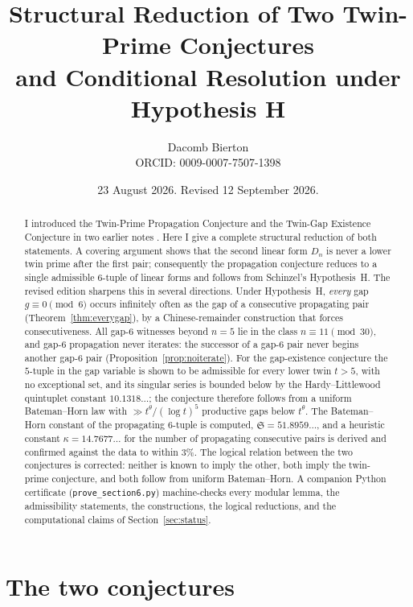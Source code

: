 \documentclass[11pt,a4paper]{article}
\title{Structural Reduction of Two Twin-Prime Conjectures\\
and Conditional Resolution under Hypothesis H}
\author{Dacomb Bierton\\ \small ORCID: 0009-0007-7507-1398}
\date{23 August 2026. Revised 12 September 2026.}
\theoremstyle{definition}
\theoremstyle{remark}
\newcommand{\Sing}{\mathfrak{S}}
\begin{document}
\maketitle

\begin{abstract}
I introduced the Twin-Prime Propagation Conjecture and the Twin-Gap Existence Conjecture in two earlier notes \cite{B1,B2}.
Here I give a complete structural reduction of both statements.
A covering argument shows that the second linear form $D_n$ is never a lower twin prime after the first pair; consequently the propagation conjecture reduces to a single admissible $6$-tuple of linear forms and follows from Schinzel's Hypothesis~H.
The revised edition sharpens this in several directions.
Under Hypothesis~H, \emph{every} gap $g\equiv 0 \pmod 6$ occurs infinitely often as the gap of a consecutive propagating pair (Theorem~\ref{thm:everygap}), by a Chinese-remainder construction that forces consecutiveness.
All gap-$6$ witnesses beyond $n=5$ lie in the class $n\equiv 11 \pmod{30}$, and gap-$6$ propagation never iterates: the successor of a gap-$6$ pair never begins another gap-$6$ pair (Proposition~\ref{prop:noiterate}).
For the gap-existence conjecture the $5$-tuple in the gap variable is shown to be admissible for every lower twin $t>5$, with no exceptional set, and its singular series is bounded below by the Hardy--Littlewood quintuplet constant $10.1318\ldots$; the conjecture therefore follows from a uniform Bateman--Horn law with $\gg t^{\theta}/(\log t)^5$ productive gaps below $t^{\theta}$.
The Bateman--Horn constant of the propagating $6$-tuple is computed, $\Sing = 51.8959\ldots$, and a heuristic constant $\kappa = 14.7677\ldots$ for the number of propagating consecutive pairs is derived and confirmed against the data to within $3\%$.
The logical relation between the two conjectures is corrected: neither is known to imply the other, both imply the twin-prime conjecture, and both follow from uniform Bateman--Horn.
A companion Python certificate (\texttt{prove\_section6.py}) machine-checks every modular lemma, the admissibility statements, the constructions, the logical reductions, and the computational claims of Section~\ref{sec:status}.
\end{abstract}

\tableofcontents

\section{The two conjectures}\label{sec:conj}
\end{document}
